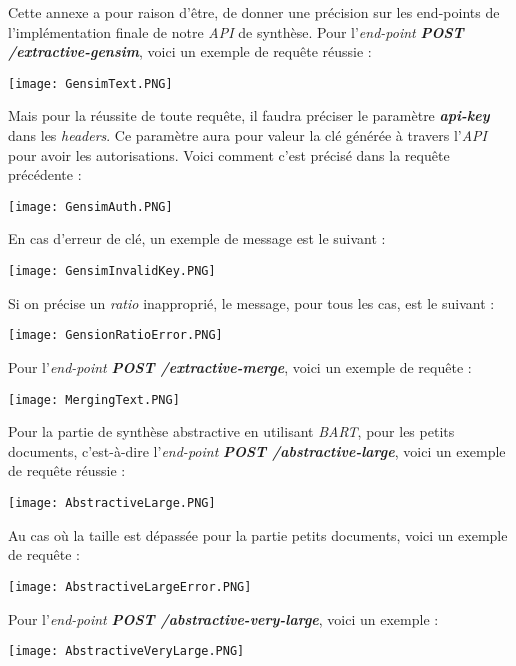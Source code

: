 Cette annexe a pour raison d'être, de donner une précision sur les end-points de l'implémentation finale de notre \textit{API} de synthèse.
Pour l'\textit{end-point} \textbf{\textit{POST /extractive-gensim}}, voici un exemple de requête réussie :
\begin{center}
\texttt{[image: GensimText.PNG]}
\end{center}
Mais pour la réussite de toute requête, il faudra préciser le paramètre \textit{\textbf{api-key}} dans les \textit{headers}. Ce paramètre aura pour valeur la clé générée à travers l'\textit{API} pour avoir les autorisations. Voici comment c'est précisé dans la requête précédente :
\begin{center}
\texttt{[image: GensimAuth.PNG]}
\end{center}
En cas d'erreur de clé, un exemple de message est le suivant :
\begin{center}
\texttt{[image: GensimInvalidKey.PNG]}
\end{center}
Si on précise un \textit{ratio} inapproprié, le message, pour tous les cas, est le suivant :
\begin{center}
\texttt{[image: GensionRatioError.PNG]}
\end{center}

Pour l'\textit{end-point} \textbf{\textit{POST /extractive-merge}}, voici un exemple de requête :
\begin{center}
\texttt{[image: MergingText.PNG]}
\end{center}

Pour la partie de synthèse abstractive en utilisant \textit{BART}, pour les petits documents, c'est-à-dire l'\textit{end-point} \textbf{\textit{POST /abstractive-large}}, voici un exemple de requête réussie :
\begin{center}
\texttt{[image: AbstractiveLarge.PNG]}
\end{center}

Au cas où la taille est dépassée pour la partie petits documents, voici un exemple de requête :
\begin{center}
\texttt{[image: AbstractiveLargeError.PNG]}
\end{center}

Pour l'\textit{end-point} \textbf{\textit{POST /abstractive-very-large}}, voici un exemple :
\begin{center}
\texttt{[image: AbstractiveVeryLarge.PNG]}
\end{center}

